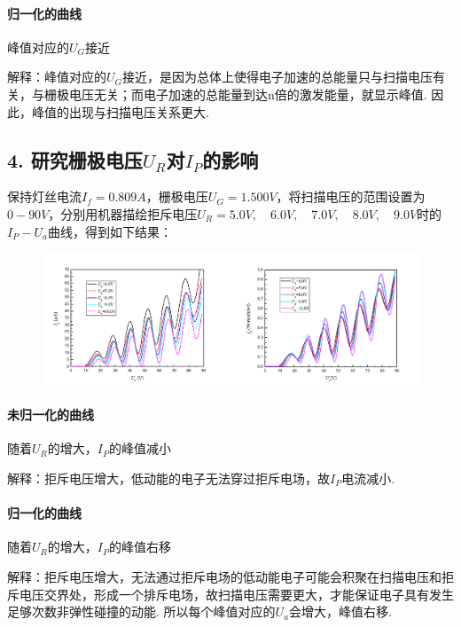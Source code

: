 \documentclass[UTF8]{ctexart}
\begin{document}
\paragraph{归一化的曲线} 峰值对应的$U_G$接近\par
解释：峰值对应的$U_G$接近，是因为总体上使得电子加速的总能量只与扫描电压有关，与栅极电压无关；而电子加速的总能量到达n倍的激发能量，就显示峰值. 因此，峰值的出现与扫描电压关系更大.

\subsection*{4. 研究栅极电压$U_R$对$I_P$的影响}

保持灯丝电流$I_f=0.809A$，栅极电压$U_G=1.500V$，将扫描电压的范围设置为$0-90V$，分别用机器描绘拒斥电压$U_R=5.0V,\quad 6.0V,\quad 7.0V,\quad 8.0V,\quad 9.0V$时的$I_P-U_a$曲线，得到如下结果：\vspace{-2em}
\begin{center}
    \begin{figure}[H]
        \includegraphics[scale=0.6]{3.png}\\\vspace{-3em}
    \end{figure}
\end{center}
\vspace{-5em}
\paragraph{未归一化的曲线} 随着$U_R$的增大，$I_P$的峰值减小\par
解释：拒斥电压增大，低动能的电子无法穿过拒斥电场，故$I_P$电流减小.
\paragraph{归一化的曲线} 随着$U_R$的增大，$I_P$的峰值右移\par
解释：拒斥电压增大，无法通过拒斥电场的低动能电子可能会积聚在扫描电压和拒斥电压交界处，形成一个排斥电场，故扫描电压需要更大，才能保证电子具有发生足够次数非弹性碰撞的动能. 所以每个峰值对应的$U_a$会增大，峰值右移.
\end{document}
